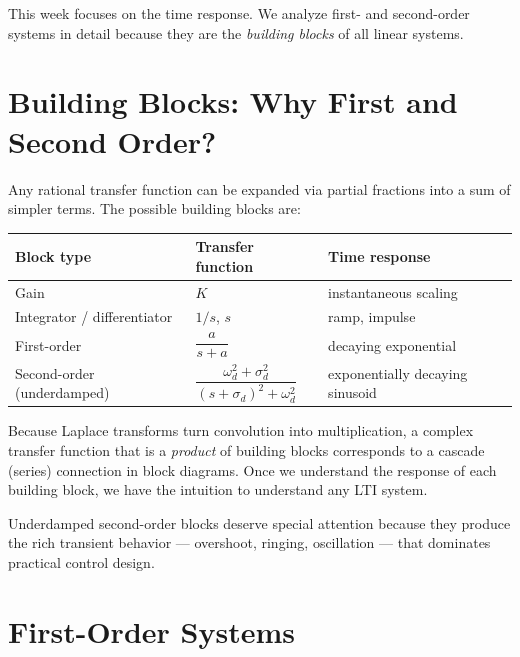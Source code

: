 \documentclass[../../book.tex]{subfiles}
\begin{document}
This week focuses on the time response.  We analyze first- and second-order
systems in detail because they are the \emph{building blocks} of all linear
systems.

\section{Building Blocks: Why First and Second Order?}
\label{sec:blocks}

Any rational transfer function can be expanded via partial fractions into a
sum of simpler terms.  The possible building blocks are:

\begin{center}
\begin{tabular}{lll}
  \toprule
  Block type & Transfer function & Time response \\
  \midrule
  Gain & $K$ & instantaneous scaling \\
  Integrator / differentiator & $1/s$, $s$ & ramp, impulse \\
  First-order & $\dfrac{a}{s+a}$ & decaying exponential \\
  Second-order (underdamped) & $\dfrac{\omega_d^2+\sigma_d^2}{(s+\sigma_d)^2+\omega_d^2}$ &
    exponentially decaying sinusoid \\
  \bottomrule
\end{tabular}
\end{center}

Because Laplace transforms turn convolution into multiplication, a complex
transfer function that is a \emph{product} of building blocks corresponds to
a cascade (series) connection in block diagrams.  Once we understand the
response of each building block, we have the intuition to understand any
LTI system.

Underdamped second-order blocks deserve special attention because they produce
the rich transient behavior --- overshoot, ringing, oscillation --- that
dominates practical control design.

\section{First-Order Systems}
\label{sec:first}
\end{document}
